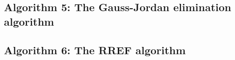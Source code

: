 \documentclass[a4paper]{article}
\begin{document}
\subsection{Algorithm 5: The Gauss-Jordan elimination algorithm}\label{algorithm:5}

\subsection{Algorithm 6: The RREF algorithm}\label{algorithm:6}

% 
% 
% 
% 
% 
% 
% 


\clearpage

\nocite{Zdunek, GoluVanl96}


\end{document}

